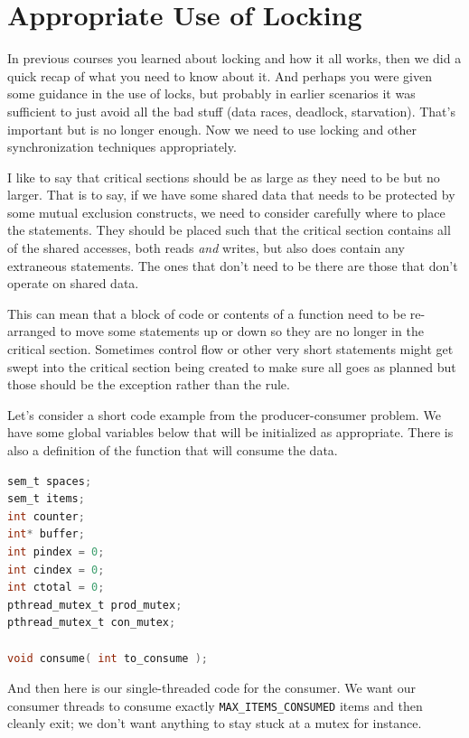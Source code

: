 \documentclass[a4paper]{report}
\begin{document}

\section*{Appropriate Use of Locking}

In previous courses you learned about locking and how it all works, then we did a quick recap of what you need to know about it. And perhaps you were given some guidance in the use of locks, but probably in earlier scenarios it was sufficient to just avoid all the bad stuff (data races, deadlock, starvation). That's important but is no longer enough. Now we need to use locking and other synchronization techniques appropriately. 

I like to say that critical sections should be as large as they need to be but no larger. That is to say, if we have some shared data that needs to be protected by some mutual exclusion constructs, we need to consider carefully where to place the statements. They should be placed such that the critical section contains all of the shared accesses, both reads \textit{and} writes, but also does contain any extraneous statements. The ones that don't need to be there are those that don't operate on shared data. 

This can mean that a block of code or contents of a function need to be re-arranged to move some statements up or down so they are no longer in the critical section. Sometimes control flow or other very short statements might get swept into the critical section being created to make sure all goes as planned but those should be the exception rather than the rule.

Let's consider a short code example from the producer-consumer problem. We have some global variables below that will be initialized as appropriate. There is also a definition of the function that will consume the data.

\begin{lstlisting}[language=C]
sem_t spaces;
sem_t items;
int counter;
int* buffer;
int pindex = 0;
int cindex = 0;
int ctotal = 0;
pthread_mutex_t prod_mutex;
pthread_mutex_t con_mutex;

void consume( int to_consume );

\end{lstlisting}

And then here is our single-threaded code for the consumer. We want our consumer threads to consume exactly {\tt MAX\_ITEMS\_CONSUMED} items and then cleanly exit; we don't want anything to stay stuck at a mutex for instance.
\end{document}
